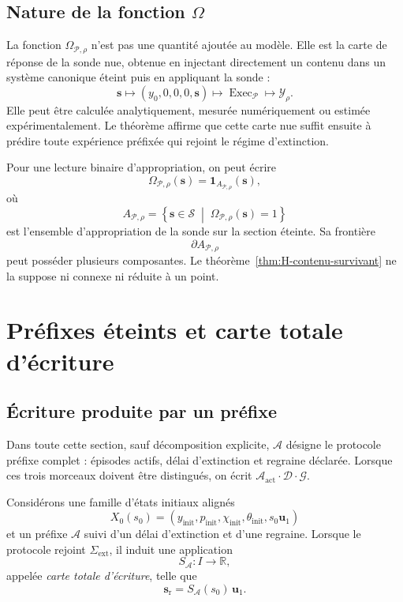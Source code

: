 \subsection{Nature de la fonction \texorpdfstring{$\Omega$}{Omega}}
\label{annexe-H-nature-Omega}

La fonction $\Omega_{\mathcal P,\rho}$ n'est pas une quantité ajoutée au
modèle. Elle est la carte de réponse de la sonde nue, obtenue en
injectant directement un contenu dans un système canonique éteint puis
en appliquant la sonde :
\[
\mathbf s
\longmapsto
(y_0,0,0,0,\mathbf s)
\longmapsto
\operatorname{Exec}_{\mathcal P}
\longmapsto
\mathcal Y_\rho.
\]
Elle peut être calculée analytiquement, mesurée numériquement ou estimée
expérimentalement. Le théorème affirme que cette carte nue suffit ensuite
à prédire toute expérience préfixée qui rejoint le régime d'extinction.

Pour une lecture binaire d'appropriation, on peut écrire
\[
\Omega_{\mathcal P,\rho}(\mathbf s)
=
\mathbf 1_{A_{\mathcal P,\rho}}(\mathbf s),
\]
où
\[
A_{\mathcal P,\rho}
=
\left\{
\mathbf s\in\mathcal S
\;\middle|\;
\Omega_{\mathcal P,\rho}(\mathbf s)=1
\right\}
\]
est l'ensemble d'appropriation de la sonde sur la section éteinte. Sa
frontière
\[
\partial A_{\mathcal P,\rho}
\]
peut posséder plusieurs composantes. Le théorème~\ref{thm:H-contenu-survivant} ne la suppose ni
connexe ni réduite à un point.

\section{Préfixes éteints et carte totale d'écriture}
\label{annexe-H-prefixes}

\subsection{Écriture produite par un préfixe}
\label{annexe-H-ecriture}

Dans toute cette section, sauf décomposition explicite, $\mathcal A$
désigne le protocole préfixe complet : épisodes actifs, délai
d'extinction et regraine déclarée. Lorsque ces trois morceaux doivent
être distingués, on écrit $\mathcal A_{\mathrm{act}}\cdot\mathcal D\cdot\mathcal G$.

Considérons une famille d'états initiaux alignés
\[
X_0(s_0)=(y_{\mathrm{init}},p_{\mathrm{init}},
\chi_{\mathrm{init}},\theta_{\mathrm{init}},s_0\mathbf u_1)
\]
et un préfixe $\mathcal A$ suivi d'un délai d'extinction et d'une
regraine. Lorsque le protocole rejoint $\Sigma_{\mathrm{ext}}$, il
induit une application
\[
S_{\mathcal A}:I\longrightarrow\mathbb R,
\]
appelée \emph{carte totale d'écriture}, telle que
\begin{equation}
\label{eq:annexe-H-carte-ecriture}
\mathbf s_{\mathrm r}
=
S_{\mathcal A}(s_0)\,\mathbf u_1.
\end{equation}

